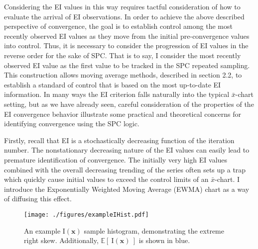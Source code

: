 \documentclass[12pt]{article}
\def \Eix {
	\mathbb{E}\left[~\text{I}(\bm{x})~\right]
}
\def \ix {
	\text{I}(\bm{x})
}
\begin{document}
	
	Considering the EI values in this way requires tactful consideration of how to evaluate the arrival of EI observations.
	In order to achieve the above described perspective of convergence, the goal is to establish control among the most recently observed EI values as they move from the initial pre-convergence values into control.
	Thus, it is necessary to consider the progression of EI values in the reverse order for the sake of SPC. %
	That is to say, I consider the most recently observed EI value as the first value to be tracked in the SPC repeated sampling.
	This construction allows moving average methods, described in section 2.2, to establish a standard of control that is based on the most up-to-date EI information. 
	In many ways the EI criterion falls naturally into the typical $\bar x$-chart setting, but as we have already seen, careful consideration of the properties of the EI convergence behavior illustrate some practical and theoretical concerns for identifying convergence using the SPC logic.
	
	
	Firstly, recall that EI is a stochastically decreasing function of the iteration number. 
	The nonstationary decreasing nature of the EI values can easily lead to premature identification of convergence.
	The initially very high EI values combined with the overall decreasing trending of the series often sets up a trap which quickly cause initial values to exceed the control limits of an $\bar x$-chart. 
	I introduce the Exponentially Weighted Moving Average (EWMA) chart as a way of diffusing this effect. 
	
	\begin{wrapfigure}{l}{0.5\textwidth}
	\vspace{-1.1cm}
	\begin{center}
	\texttt{[image: ./figures/exampleIHist.pdf]}
	\end{center}
	\vspace{-0.85cm}
	\caption{An example $\ix$ sample histogram, demonstrating the extreme right skew. Additionally, $\Eix$ is shown in blue.}
	\label{IxEX}
	\end{wrapfigure}
\end{document}
